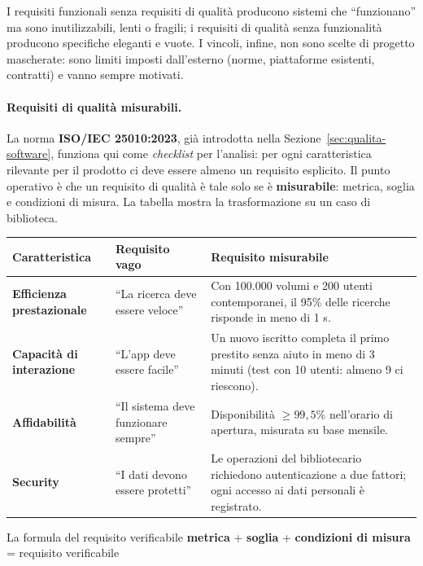 \documentclass[12pt]{extarticle}
\begin{document}
\noindent I requisiti funzionali senza requisiti di qualità producono sistemi che ``funzionano'' ma sono inutilizzabili, lenti o fragili; i requisiti di qualità senza funzionalità producono specifiche eleganti e vuote. I vincoli, infine, non sono scelte di progetto mascherate: sono limiti imposti dall'esterno (norme, piattaforme esistenti, contratti) e vanno sempre motivati.

\paragraph{Requisiti di qualità misurabili.}
La norma \textbf{ISO/IEC 25010:2023}, già introdotta nella Sezione~\ref{sec:qualita-software}, funziona qui come \textit{checklist} per l'analisi: per ogni caratteristica rilevante per il prodotto ci deve essere almeno un requisito esplicito. Il punto operativo è che un requisito di qualità è tale solo se è \textbf{misurabile}: metrica, soglia e condizioni di misura. La tabella mostra la trasformazione su un caso di biblioteca.

\begin{center}
\small
\begin{tabular}{p{3.0cm}p{4.6cm}p{7.6cm}}
    \toprule
    \textbf{Caratteristica} & \textbf{Requisito vago} & \textbf{Requisito misurabile} \\
    \midrule
    \textbf{Efficienza prestazionale} & ``La ricerca deve essere veloce'' & Con 100.000 volumi e 200 utenti contemporanei, il 95\% delle ricerche risponde in meno di 1 s. \\
    \addlinespace
    \textbf{Capacità di interazione} & ``L'app deve essere facile'' & Un nuovo iscritto completa il primo prestito senza aiuto in meno di 3 minuti (test con 10 utenti: almeno 9 ci riescono). \\
    \addlinespace
    \textbf{Affidabilità} & ``Il sistema deve funzionare sempre'' & Disponibilità $\geq 99{,}5\%$ nell'orario di apertura, misurata su base mensile. \\
    \addlinespace
    \textbf{Security} & ``I dati devono essere protetti'' & Le operazioni del bibliotecario richiedono autenticazione a due fattori; ogni accesso ai dati personali è registrato. \\
    \bottomrule
\end{tabular}
\end{center}

\begin{cbox}{La formula del requisito verificabile}
\centering
\textbf{metrica} + \textbf{soglia} + \textbf{condizioni di misura} = requisito verificabile
\end{cbox}
\end{document}
